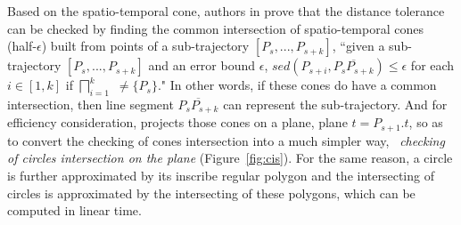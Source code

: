 Based on the spatio-temporal cone, authors in \cite{Lin:Cised} prove that the \sed distance tolerance can be checked by finding the common intersection of spatio-temporal cones  (half-$\epsilon$) built from points of a sub-trajectory $[P_s,...,P_{s+k}]$, \ie ``{given a sub-trajectory $[P_s,...,P_{s+k}]$ and an error bound $\epsilon$, $sed(P_{s+i}, \overline{P_sP_{s+k}})\le \epsilon$ for each $i \in [1,k]$ if  $\bigsqcap_{i=1}^{k}$ $\ne \{P_s\}$}."
In other words, if these cones do have a common intersection, then line segment $\overline{P_sP_{s+k}}$ can represent the sub-trajectory. And for efficiency consideration, \cised projects those cones on a plane, \eg plane $t=P_{s+1}.t$, so as to convert the checking of cones intersection into a much simpler way, \ie~\textit{checking of circles intersection on the plane} (Figure~\ref{fig:cis}).
For the same reason, a circle is further approximated by its inscribe regular polygon and the intersecting of circles is approximated by the intersecting of these polygons, which can be computed in linear time.
%




